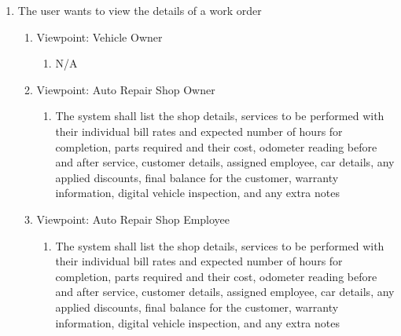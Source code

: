 \documentclass[12pt]{article}
\begin{document}
\begin{enumerate}[resume*=business_events]
	\item The user wants to view the details of a work order
	      \begin{enumerate}[VP\arabic*.]
		      \item Viewpoint: Vehicle Owner
		            \begin{enumerate}
			            \item[] N/A
		            \end{enumerate}
		      \item Viewpoint: Auto Repair Shop Owner
		            \begin{enumerate}
			            \item The system shall list the shop details, services to be performed with their individual bill rates
			                  and expected number of hours for completion, parts required and their cost, odometer reading before
			                  and after service, customer details, assigned employee, car details, any applied discounts, final
			                  balance for the customer, warranty information, digital vehicle inspection, and any extra notes
		            \end{enumerate}
		      \item Viewpoint: Auto Repair Shop Employee
		            \begin{enumerate}
			            \item The system shall list the shop details, services to be performed with their individual bill rates
			                  and expected number of hours for completion, parts required and their cost, odometer reading before
			                  and after service, customer details, assigned employee, car details, any applied discounts, final
			                  balance for the customer, warranty information, digital vehicle inspection, and any extra notes
		            \end{enumerate}
	      \end{enumerate}
\end{enumerate}
\end{document}
